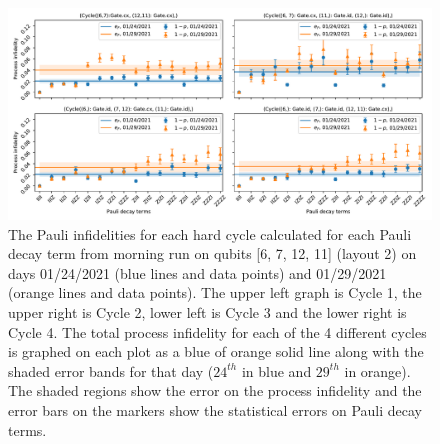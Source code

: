 \begin{figure}[htpb]
    \includegraphics[scale=0.56]{CBPauliInfidelities_24_29_01_2021_MorningRun_Layout2_Cycle1_2_3_4.pdf}
    \caption{The Pauli infidelities for each hard cycle calculated for each Pauli decay term from morning run on qubits [6, 7, 12, 11] (layout 2) on days 01/24/2021 (blue lines and data points) and 01/29/2021 (orange lines and data points). The upper left graph is Cycle 1, the upper right is Cycle 2, lower left is Cycle 3 and the lower right is Cycle 4.  The total process infidelity for each of the 4 different cycles is graphed on each plot as a blue of orange solid line along with the shaded error bands for that day ($24^{th}$ in blue and $29^{th}$ in orange).  The shaded regions show the error on the process infidelity and the error bars on the markers show the statistical errors on Pauli decay terms. }
    \label{fig:PauliInfidelities24_29_Story4}
\end{figure}










